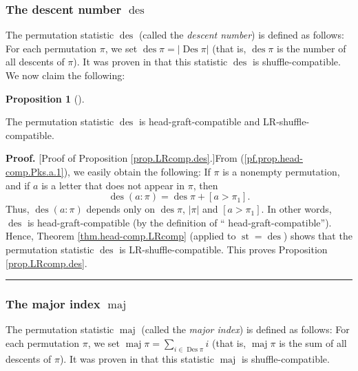 \documentclass[numbers=enddot,12pt,final,onecolumn,notitlepage]{scrartcl}%
\theoremstyle{definition}
\newtheorem{prop}[theo]{Proposition}
\newenvironment{proposition}[1][]
{\begin{prop}[#1]\begin{leftbar}}
{\end{leftbar}\end{prop}}
\newenvironment{proof}[1][Proof]{\noindent\textbf{#1.} }{\ \rule{0.5em}{0.5em}}
\let\sumnonlimits\sum
\renewcommand{\sum}{\sumnonlimits\limits}
\begin{document}
\subsubsection{The descent number $\operatorname{des}$}

The permutation statistic $\operatorname{des}$ (called the \textit{descent
number}) is defined as follows: For each permutation $\pi$, we set
$\operatorname{des}\pi=\left\vert \operatorname{Des}\pi\right\vert $ (that
is, $\operatorname{des}\pi$ is the number of all descents of $\pi$). It was
proven in \cite[Theorem 4.6 \textbf{(a)}]{part1} that this statistic
$\operatorname{des}$ is shuffle-compatible. We now claim the following:

\begin{proposition}
\label{prop.LRcomp.des}The permutation statistic $\operatorname{des}$ is
head-graft-compatible and LR-shuffle-compatible.
\end{proposition}

\begin{proof}
[Proof of Proposition \ref{prop.LRcomp.des}.]From
(\ref{pf.prop.head-comp.Pks.a.1}), we easily obtain the following: If $\pi$ is
a nonempty permutation, and if $a$ is a letter that does not appear in $\pi$,
then%
\[
\operatorname{des}\left(  a:\pi\right)  =\operatorname{des}\pi+\left[
a>\pi_{1}\right]  .
\]
Thus, $\operatorname{des}\left(  a:\pi\right)  $ depends only on
$\operatorname{des}\pi$, $\left\vert \pi\right\vert $ and $\left[  a>\pi
_{1}\right]  $. In other words, $\operatorname{des}$ is head-graft-compatible
(by the definition of \textquotedblleft
head-graft-compatible\textquotedblright). Hence,
Theorem \ref{thm.head-comp.LRcomp}
(applied to $\operatorname{st}=\operatorname{des}$) shows that
the permutation statistic $\operatorname{des}$ is
LR-shuffle-compatible. This proves Proposition \ref{prop.LRcomp.des}.
\end{proof}

\subsubsection{The major index $\operatorname*{maj}$}

The permutation statistic $\operatorname*{maj}$ (called the \textit{major
index}) is defined as follows: For each permutation $\pi$, we set
$\operatorname*{maj}\pi=\sum_{i\in\operatorname{Des}\pi}i$ (that is,
$\operatorname*{maj}\pi$ is the sum of all descents of $\pi$). It was proven
in \cite[Theorem 3.1 \textbf{(a)}]{part1} that this statistic
$\operatorname*{maj}$ is shuffle-compatible.
\end{document}
